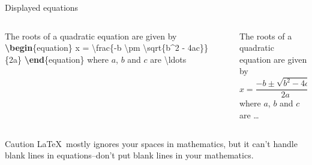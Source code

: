 \documentclass[,aspectratio=43]{beamer}
\newcommand{\VERB}{\Verb[commandchars=\\\{\}]}
\newenvironment{Shaded}{\begin{snugshade}}{\end{snugshade}}
\newcommand{\ExtensionTok}[1]{#1}
\newcommand{\FunctionTok}[1]{\textcolor[rgb]{0.02,0.16,0.49}{#1}}
\newcommand{\KeywordTok}[1]{\textcolor[rgb]{0.00,0.44,0.13}{\textbf{#1}}}
\newcommand{\NormalTok}[1]{#1}
\newcommand{\SpecialCharTok}[1]{\textcolor[rgb]{0.25,0.44,0.63}{#1}}
\newcommand{\SpecialStringTok}[1]{\textcolor[rgb]{0.73,0.40,0.53}{#1}}
\providecommand{\tightlist}{%
  \setlength{\itemsep}{0pt}\setlength{\parskip}{0pt}}
\begin{document}
\begin{frame}[fragile]{Displayed equations}

\begin{columns}[T]
\begin{column}{0.58\textwidth}
\small
\vspace{-1.1em}

\begin{Shaded}
\begin{Highlighting}[]
\NormalTok{The roots of a quadratic equation are}
\NormalTok{given by}
\KeywordTok{\textbackslash{}begin}\NormalTok{\{}\ExtensionTok{equation}\NormalTok{\}}
\SpecialStringTok{x = }\SpecialCharTok{\textbackslash{}frac}\SpecialStringTok{\{{-}b }\SpecialCharTok{\textbackslash{}pm}\SpecialStringTok{ }\SpecialCharTok{\textbackslash{}sqrt}\SpecialStringTok{\{b\^{}2 {-} 4ac\}\}}
\SpecialStringTok{         \{2a\}}
\KeywordTok{\textbackslash{}end}\NormalTok{\{}\ExtensionTok{equation}\NormalTok{\}}
\NormalTok{where }\SpecialStringTok{$a$}\NormalTok{, }\SpecialStringTok{$b$}\NormalTok{ and }\SpecialStringTok{$c$}\NormalTok{ are }\FunctionTok{\textbackslash{}ldots}
\end{Highlighting}
\end{Shaded}
\end{column}

\begin{column}{0.38\textwidth}
The roots of a quadratic equation are given by \begin{equation}
x = \frac{-b \pm \sqrt{b^2 - 4ac}}
{2a} \end{equation} where \(a\), \(b\) and \(c\) are \ldots
\end{column}
\end{columns}

\vspace{0.5em}

\begin{alertblock}{Caution}
\LaTeX~mostly ignores your spaces in mathematics, but it can't handle
blank lines in equations--don't put blank lines in your mathematics.

\end{alertblock}
\end{frame}
\end{document}
